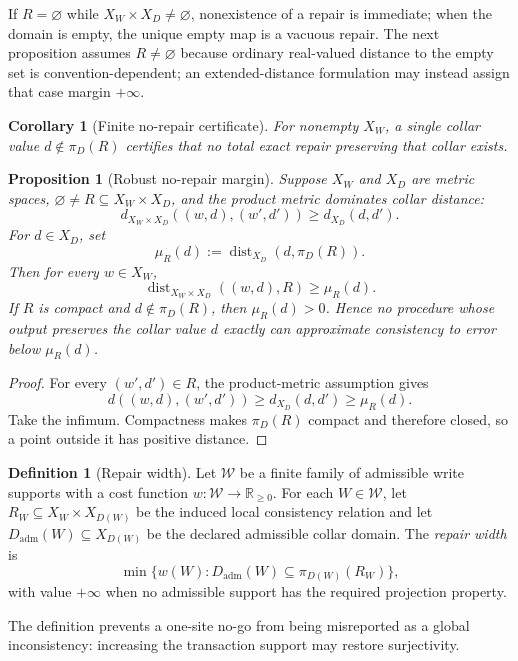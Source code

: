 \documentclass[11pt]{article}
\newtheorem{proposition}[theorem]{Proposition}
\newtheorem{corollary}[theorem]{Corollary}
\theoremstyle{definition}
\newtheorem{definition}[theorem]{Definition}
\theoremstyle{remark}
\numberwithin{equation}{section}
\newcommand{\dist}{\operatorname{dist}}
\begin{document}
If $R=\varnothing$ while $X_W\times X_D\ne\varnothing$, nonexistence of a
repair is immediate; when the domain is empty, the unique empty map is a
vacuous repair.  The next proposition assumes $R\ne\varnothing$ because
ordinary real-valued distance to the empty set is convention-dependent; an
extended-distance formulation may instead assign that case margin $+\infty$.

\begin{corollary}[Finite no-repair certificate]
For nonempty $X_W$, a single collar value
$d\notin\pi_D(R)$ certifies that no total exact repair preserving that collar
exists.
\end{corollary}

\begin{proposition}[Robust no-repair margin]\label{prop:robust-no-repair}
Suppose $X_W$ and $X_D$ are metric spaces, $\varnothing\ne R\subseteq X_W\times X_D$, and the product metric dominates collar distance:
\[
 d_{X_W\times X_D}((w,d),(w',d'))\ge d_{X_D}(d,d').
\]
For $d\in X_D$, set
\[
 \mu_R(d):=\dist_{X_D}(d,\pi_D(R)).
\]
Then for every $w\in X_W$,
\[
 \dist_{X_W\times X_D}((w,d),R)\ge\mu_R(d).
\]
If $R$ is compact and $d\notin\pi_D(R)$, then $\mu_R(d)>0$.  Hence no procedure whose output preserves the collar value $d$ exactly can approximate consistency to error below $\mu_R(d)$.
\end{proposition}

\begin{proof}
For every $(w',d')\in R$, the product-metric assumption gives
\[
 d((w,d),(w',d'))
 \ge d_{X_D}(d,d')
 \ge \mu_R(d).
\]
Take the infimum.  Compactness makes $\pi_D(R)$ compact and therefore
closed, so a point outside it has positive distance.
\end{proof}

\begin{definition}[Repair width]
Let $\mathscr W$ be a finite family of admissible write supports with a cost function $w:\mathscr W\to\mathbb R_{\ge0}$.  For each $W\in\mathscr W$, let $R_W\subseteq X_W\times X_{D(W)}$ be the induced local consistency relation and let $D_{\mathrm{adm}}(W)\subseteq X_{D(W)}$ be the declared admissible collar domain.  The \emph{repair width} is
\[
 \min\{w(W):D_{\mathrm{adm}}(W)\subseteq\pi_{D(W)}(R_W)\},
\]
with value $+\infty$ when no admissible support has the required projection property.
\end{definition}

The definition prevents a one-site no-go from being misreported as a global inconsistency: increasing the transaction support may restore surjectivity.
\end{document}
